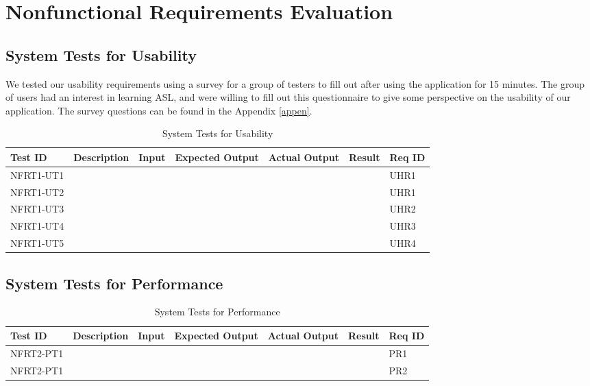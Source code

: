 \documentclass[12pt, titlepage]{article}
\begin{document}
\section{Nonfunctional Requirements Evaluation}

\subsection{System Tests for Usability}

We tested our usability requirements using a survey for a group of testers to fill out after using the application for 15 minutes. The group of users had an interest in learning ASL, and were willing to fill out this questionnaire to give some perspective on the usability of our application. The survey questions can be found in the Appendix \ref{appen}.

\begin{longtable}{|p{2cm}|p{3cm}|p{2cm}|p{2cm}|p{2cm}|p{2cm}|p{1cm}|}
\caption{System Tests for Usability} \\
\hline
\textbf{Test ID} & \textbf{Description} & \textbf{Input} & \textbf{Expected Output} & \textbf{Actual Output} & \textbf{Result} & \textbf{Req ID}\\
\hline
NFRT1-UT1 & & & & & & UHR1 \\
\hline
NFRT1-UT2 & & & & & & UHR1 \\
\hline
NFRT1-UT3 & & & & & & UHR2 \\
\hline
NFRT1-UT4 & & & & & & UHR3 \\
\hline
NFRT1-UT5 & & & & & & UHR4 \\
\bottomrule
\end{longtable}
		
\subsection{System Tests for Performance}

\begin{longtable}{|p{2cm}|p{3cm}|p{2cm}|p{2cm}|p{2cm}|p{2cm}|p{1cm}|}
\caption{System Tests for Performance} \\
\hline
\textbf{Test ID} & \textbf{Description} & \textbf{Input} & \textbf{Expected Output} & \textbf{Actual Output} & \textbf{Result} & \textbf{Req ID}\\
\hline
NFRT2-PT1& & & & & & PR1 \\
\hline
NFRT2-PT1 & & & & & & PR2 \\
\bottomrule
\end{longtable}
	
\end{document}
